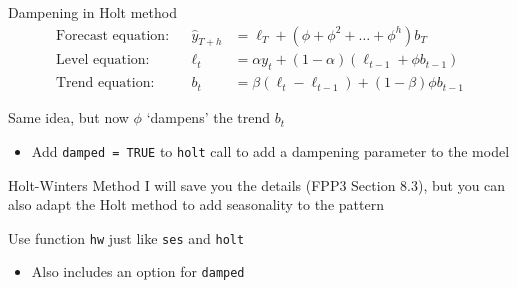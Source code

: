 \documentclass[aspectratio=169,t,11pt,table]{beamer}
\begin{document}
\begin{frame}{Dampening in Holt method}
  \begin{align*}
    \text{Forecast equation:} && \hat{y}_{T+h} &= \ell_{T} + (\phi+\phi^2 + \dots + \phi^{h}) b_{T} \\[2mm]
    \text{Level equation:}    && \ell_{t} &= \alpha y_{t} + (1 - \alpha)(\ell_{t-1} + \phi b_{t-1}) \\[2mm]
    \text{Trend equation:}    && b_{t}    &= \beta(\ell_{t} - \ell_{t-1}) + (1 -\beta) \phi b_{t-1}
  \end{align*}

  \bigskip
  Same idea, but now $\phi$ `dampens' the trend $b_t$
  \begin{itemize}
    \item Add \texttt{damped = TRUE} to \texttt{holt} call to add a dampening parameter to the model
  \end{itemize}
\end{frame}



\begin{frame}{Holt-Winters Method}
  I will save you the details (FPP3 Section 8.3), but you can also adapt the Holt method to add seasonality to the pattern 

  \bigskip
  Use function \texttt{hw} just like \texttt{ses} and \texttt{holt}
  \begin{itemize}
    \item Also includes an option for \texttt{damped}
  \end{itemize}
\end{frame}

\end{document}
